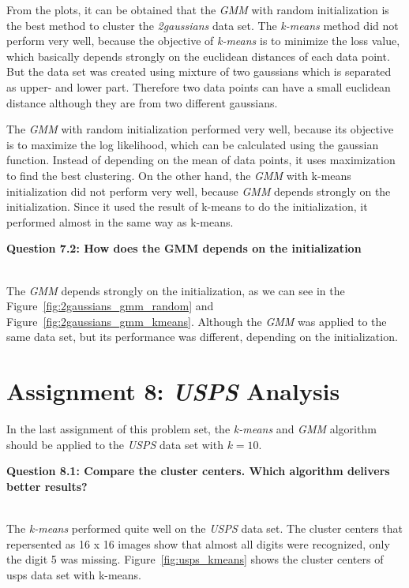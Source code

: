 From the plots, it can be obtained that the \textit{GMM} with random initialization is the best method to cluster the \textit{2gaussians} data set. The \textit{k-means} method did not perform very well, because the objective of \textit{k-means} is to minimize the loss value, which basically depends strongly on the euclidean distances of each data point. But the data set was created using mixture of two gaussians which is separated as upper- and lower part. Therefore two data points can have a small euclidean distance although they are from two different gaussians. 

The \textit{GMM} with random initialization performed very well, because its objective is to maximize the log likelihood, which can be calculated using the gaussian function. Instead of depending on the mean of data points, it uses maximization to find the best clustering. On the other hand, the \textit{GMM} with k-means initialization did not perform very well, because \textit{GMM} depends strongly on the initialization. Since it used the result of k-means to do the initialization, it performed almost in the same way as k-means.\\

{\raggedright \textbf{Question 7.2: How does the GMM depends on the initialization}}\\

The \textit{GMM} depends strongly on the initialization, as we can see in the Figure~\ref{fig:2gaussians_gmm_random} and Figure~\ref{fig:2gaussians_gmm_kmeans}. Although the \textit{GMM} was applied to the same data set, but its performance was different, depending on the initialization.


\section{Assignment 8: \textit{USPS} Analysis}
\label{assignment8}

In the last assignment of this problem set, the \textit{k-means} and \textit{GMM} algorithm should be applied to the \textit{USPS} data set with $k=10$.\\

{\raggedright \textbf{Question 8.1: Compare the cluster centers. Which algorithm delivers better results?}}\\

The \textit{k-means} performed quite well on the \textit{USPS} data set. The cluster centers that repersented as 16 x 16 images show that almost all digits were recognized, only the digit 5 was missing. Figure~\ref{fig:usps_kmeans} shows the cluster centers of usps data set with k-means.

